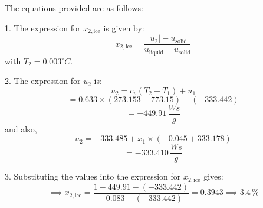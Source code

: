 The equations provided are as follows:

1. The expression for \( x_{2, \text{ice}} \) is given by:
\[ x_{2, \text{ice}} = \frac{|u_2| - u_{\text{solid}}}{u_{\text{liquid}} - u_{\text{solid}}} \]
with \( T_2 = 0.003^\circ C \).

2. The expression for \( u_2 \) is:
\[ u_2 = c_v (T_2 - T_1) + u_1 \]
\[ = 0.633 \times (273.153 - 773.15) + (-333.442) \]
\[ = -449.91 \, \frac{Ws}{g} \]
and also,
\[ u_2 = -333.485 + x_1 \times (-0.045 + 333.178) \]
\[ = -333.410 \, \frac{Ws}{g} \]

3. Substituting the values into the expression for \( x_{2, \text{ice}} \) gives:
\[ \implies x_{2, \text{ice}} = \frac{1 - 449.91 - (-333.442)}{-0.083 - (-333.442)} = 0.3943 \implies 3.4 \, \% \]